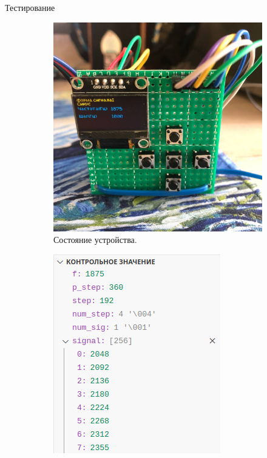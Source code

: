 \documentclass[10pt]{beamer}
\begin{document}
\begin{frame}{Тестирование}
\begin{figure}
     \begin{subfigure}[H]{0.45\textwidth}
         \centering
         \includegraphics[width=\textwidth]{test4_u_f}
         \caption*{Состояние устройства.}
     \end{subfigure}
     \hfill
     \begin{subfigure}[H]{0.45\textwidth}
         \centering
         \includegraphics[width=\textwidth]{test4_o_f}

\end{subfigure}
\end{figure}
\end{frame}
\end{document}
